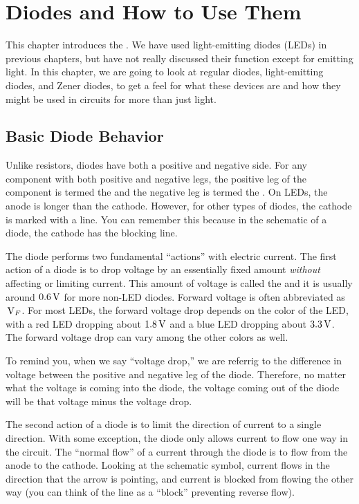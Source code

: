 \chapter{Diodes and How to Use Them}

This chapter introduces the .  
We have used light-emitting diodes (LEDs) in previous chapters, but have not really discussed their function except for emitting light.
In this chapter, we are going to look at regular diodes, light-emitting diodes, and Zener diodes, to get a feel for what these devices are and how they might be used in circuits for more than just light.


\section{Basic Diode Behavior}

Unlike resistors, diodes have both a positive and negative side.
For any component with both positive and negative legs, the positive leg of the component is termed the  and the negative leg is termed the .
On LEDs, the anode is longer than the cathode.
However, for other types of diodes, the cathode is marked with a line.
You can remember this because in the schematic of a diode, the cathode has the blocking line.

The diode performs two fundamental ``actions'' with electric current.  
The first action of a diode is to drop voltage by an essentially fixed amount \emph{without} affecting or limiting current.
This amount of voltage is called the  and it is usually around $0.6\,\si{\volt}$ for more non-LED diodes. 
Forward voltage is often abbreviated as $\,\si{\volt}_F$.
For most LEDs, the forward voltage drop depends on the color of the LED, with a red LED dropping about $1.8\,\si{\volt}$ and a blue LED dropping about $3.3\,\si{\volt}$.
The forward voltage drop can vary among the other colors as well.

To remind you, when we say ``voltage drop,'' we are referrig to the difference in voltage between the positive and negative leg of the diode.
Therefore, no matter what the voltage is coming into the diode, the voltage coming out of the diode will be that voltage minus the voltage drop.

The second action of a diode is to limit the direction of current to a single direction.
With some exception, the diode only allows current to flow one way in the circuit.
The ``normal flow'' of a current through the diode is to flow from the anode to the cathode.
Looking at the schematic symbol, current flows in the direction that the arrow is pointing, and current is blocked from flowing the other way (you can think of the line as a ``block'' preventing reverse flow).

